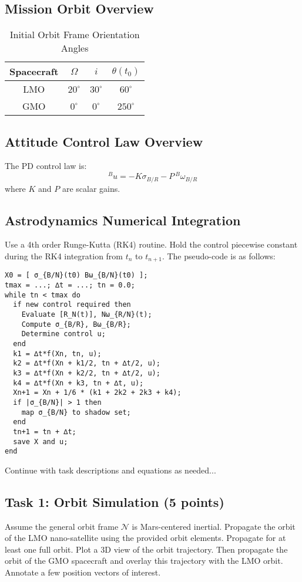 \documentclass[12pt]{article}
\begin{document}
\subsection{Mission Orbit Overview}
\begin{table}[h!]
\centering
\caption{Initial Orbit Frame Orientation Angles}
\begin{tabular}{@{}cccc@{}}
\toprule
Spacecraft & $\Omega$ & $i$ & $\theta(t_0)$ \\
\midrule
LMO & $20^\circ$ & $30^\circ$ & $60^\circ$ \\
GMO & $0^\circ$ & $0^\circ$ & $250^\circ$ \\
\bottomrule
\end{tabular}
\end{table}

\subsection{Attitude Control Law Overview}
The PD control law is:
\begin{equation}
{}^B\!u = -K\sigma_{B/R} - P\,{}^B\omega_{B/R}
\end{equation}
where $K$ and $P$ are scalar gains.

\subsection{Astrodynamics Numerical Integration}
Use a 4th order Runge-Kutta (RK4) routine. Hold the control piecewise constant during the RK4 integration from $t_n$ to $t_{n+1}$. The pseudo-code is as follows:

\begin{verbatim}
X0 = [ σ_{B/N}(t0) Bω_{B/N}(t0) ];
tmax = ...; ∆t = ...; tn = 0.0;
while tn < tmax do
  if new control required then
    Evaluate [R_N(t)], Nω_{R/N}(t);
    Compute σ_{B/R}, Bω_{B/R};
    Determine control u;
  end
  k1 = ∆t*f(Xn, tn, u);
  k2 = ∆t*f(Xn + k1/2, tn + ∆t/2, u);
  k3 = ∆t*f(Xn + k2/2, tn + ∆t/2, u);
  k4 = ∆t*f(Xn + k3, tn + ∆t, u);
  Xn+1 = Xn + 1/6 * (k1 + 2k2 + 2k3 + k4);
  if |σ_{B/N}| > 1 then
    map σ_{B/N} to shadow set;
  end
  tn+1 = tn + ∆t;
  save X and u;
end
\end{verbatim}

\noindent Continue with task descriptions and equations as needed...
\subsection{Task 1: Orbit Simulation (5 points)}
Assume the general orbit frame \(\mathcal{N}\) is Mars-centered inertial. Propagate the orbit of the LMO nano-satellite using the provided orbit elements. Propagate for at least one full orbit. Plot a 3D view of the orbit trajectory. Then propagate the orbit of the GMO spacecraft and overlay this trajectory with the LMO orbit. Annotate a few position vectors of interest.
\end{document}
